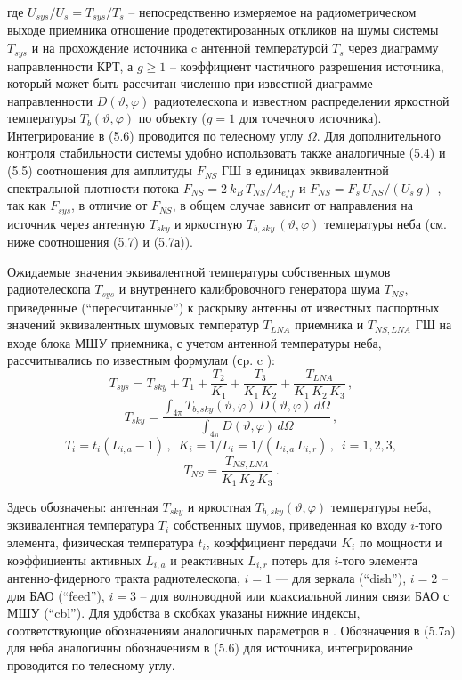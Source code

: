 \noindent
где $ U_{sys} / U_s = T_{sys} / T_s$ -- непосредственно измеряемое на
радиометрическом выходе приемника отношение продетектированных
откликов на шумы системы $T_{sys}$ и на прохождение источника c
антенной температурой $T_s$ через диаграмму направленности КРТ,
а $g \ge 1$ -- коэффициент частичного разрешения источника,
который может быть рассчитан численно при известной диаграмме
направленности $D(\vartheta, \varphi)$ радиотелескопа и
известном распределении яркостной температуры
$T_b (\vartheta, \varphi)$
по объекту ($g = 1$ для точечного источника).
Интегрирование в (5.6) проводится по телесному углу $\Omega$.
Для дополнительного контроля
стабильности системы удобно использовать также
аналогичные (5.4) и (5.5) соотношения для амплитуды $F_{NS}$
ГШ в единицах эквивалентной спектральной плотности потока
$F_{NS} = 2\ k_B\, T_{NS} / A_{eff}$ и
$F_{NS} = F_s\, U_{NS} / (U_s\, g)$  \cite{},
так как $F_{sys}$, в отличие от $F_{NS}$, в общем случае зависит от
направления на источник через антенную $T_{sky}$ и яркостную
$T_{b,sky}\, (\vartheta, \varphi)$ температуры неба (см. ниже
соотношения (5.7) и (5.7а)).

Ожидаемые значения эквивалентной температуры собственных шумов радиотелескопа
$T_{sys}$ и внутреннего калибровочного генератора шума $T_{NS}$,
приведенные (``пересчитанные'') к раскрыву антенны от известных паспортных
значений эквивалентных шумовых температур $T_{LNA}$ приемника и $T_{NS,LNA}$ ГШ
на входе блока МШУ приемника, с учетом антенной температуры
неба, рассчитывались по известным формулам (сp. c  \cite{}):
$$
T_{sys} = T_{sky} + T_1 + \frac{T_2}{K_1} +
\frac{T_3}{K_1\, K_2} + \frac{T_{LNA}}{K_1\, K_2\, K_3}\,,
$$
$$
T_{sky} = \frac{\int_{4 \pi}^{}{T_{b,sky} (\vartheta, \varphi)\, D(\vartheta, \varphi)\, d\Omega}}
{\int_{4 \pi}^{}{D(\vartheta, \varphi)\, d \Omega}} \,,
$$
$$
T_i = t_i (L_{i,a} -1)\, , \,\,\,
K_i = 1/ L_i = 1 / (L_{i,a}\, L_{i,r})\, , \,\,\, i = 1, 2, 3,
$$
$$
T_{NS} = \frac{T_{NS,LNA}}{K_1\, K_2\, K_3}\,.
$$


\noindent
Здесь обозначены: антенная $T_{sky}$ и яркостная  $T_{b,sky} (\vartheta, \varphi)$
температуры неба, эквивалентная температура $T_i$ собственных шумов,
приведенная ко входу $i$-того элемента,
физическая температура $t_i$, коэффициент передачи $K_i$ по мощности
и коэффициенты активных $L_{i,a}$ и реактивных $L_{i,r}$ потерь
для $i$-того элемента антенно-фидерного тракта радиотелескопа,
$i = 1$ --- для зеркала (``dish''), $i = 2$ -- для БАО (``feed''),
$i = 3$ -- для волноводной или коаксиальной линия связи БАО с МШУ (``cbl'').
Для удобства в скобках указаны нижние индексы, соответствующие обозначениям
аналогичных параметров в \cite{}.
Обозначения в (5.7a) для неба аналогичны обозначениям в (5.6) для источника,
интегрирование проводится по телесному углу.

